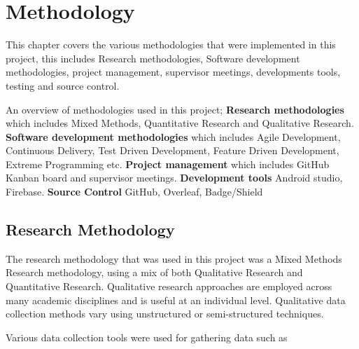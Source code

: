 \chapter{Methodology}
This chapter covers the various methodologies that were implemented in this project, this includes Research methodologies, Software development methodologies, project management, supervisor meetings, developments tools, testing and source control.\newline

An overview of methodologies used in this project; \textbf{Research methodologies} which includes Mixed Methods, Quantitative Research and Qualitative Research.
\textbf{Software development methodologies} which includes Agile Development, Continuous Delivery, Test Driven Development, Feature Driven Development, Extreme Programming etc.
\textbf{Project management} which includes GitHub Kanban board and supervisor meetings.
\textbf{Development tools} Android studio, Firebase.
\textbf{Source Control} GitHub, Overleaf, Badge/Shield

\newpage

\section{Research Methodology}
The research methodology that was used in this project was a Mixed Methods 
Research methodology, using a mix of both Qualitative Research and Quantitative 
Research. Qualitative research approaches are employed across many academic 
disciplines and is useful at an individual level. Qualitative data collection
methods vary using unstructured or semi-structured techniques.

\medskip
Various data collection tools were used for gathering data such as

